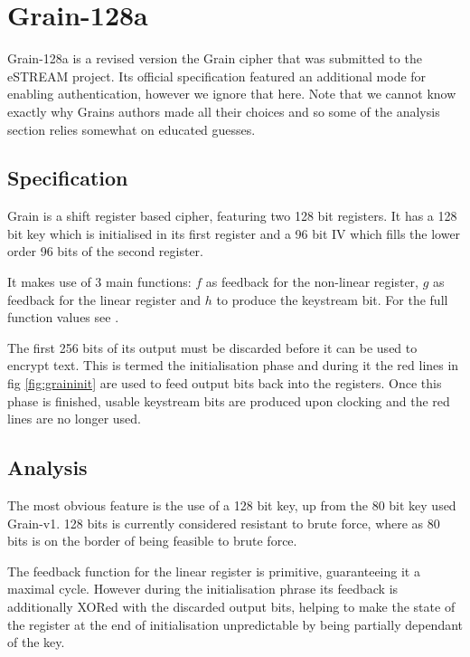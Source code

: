 \documentclass{report}
\let\Oldsection\section
\renewcommand{\section}{\FloatBarrier\Oldsection}
\let\Oldsubsection\subsection
\renewcommand{\subsection}{\FloatBarrier\Oldsubsection}
\begin{document}
\section{Grain-128a}
Grain-128a is a revised version the Grain cipher that was submitted to the eSTREAM project\cite{Grain128aSpec}. Its official specification featured an additional mode for enabling authentication, however we ignore that here. Note that we cannot know exactly why Grains authors made all their choices and so some of the analysis section relies somewhat on educated guesses.
\begin{figure}[h]
\end{figure}
\subsection{Specification}
Grain is a shift register based cipher, featuring two 128 bit registers. It has a 128 bit key which is initialised in its first register and a 96 bit IV which fills the lower order 96 bits of the second register.

It makes use of 3 main functions: $f$ as feedback for the non-linear register, $g$ as feedback for the linear register and $h$ to produce the keystream bit. For the full function values see \cite{Grain128aSpec}.

The first 256 bits of its output must be discarded before it can be used to encrypt text. This is termed the initialisation phase and during it the red lines in fig \ref{fig:graininit} are used to feed output bits back into the registers. Once this phase is finished, usable keystream bits are produced upon clocking and the red lines are no longer used.
\subsection{Analysis}

The most obvious feature is the use of a 128 bit key, up from the 80 bit key used Grain-v1. 128 bits is currently considered resistant to brute force, where as 80 bits is on the border of being feasible to brute force\cite{80keysize}.

The feedback function for the linear register is primitive, guaranteeing it a maximal cycle\cite{linearMaximal}. However during the initialisation phrase its feedback is additionally XORed with the discarded output bits, helping to make the state of the register at the end of initialisation unpredictable by being partially dependant of the key.
\end{document}
